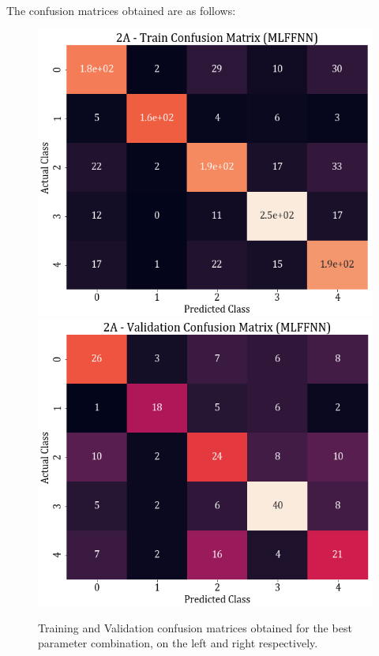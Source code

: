 \documentclass[11pt,a4paper]{article}
\newcommand{\noi}{\noindent}
\begin{document}
\noi
The confusion matrices obtained are as follows:
\begin{figure}[H]
    \centering
    \includegraphics[scale=0.4]{images/2A_MLFFNN_train_confmat.png}
    \includegraphics[scale=0.4]{images/2A_MLFFNN_val_confmat.png}
    \caption{Training and Validation confusion matrices obtained for the best parameter combination, on the left and right respectively.}
\end{figure}
\end{document}
